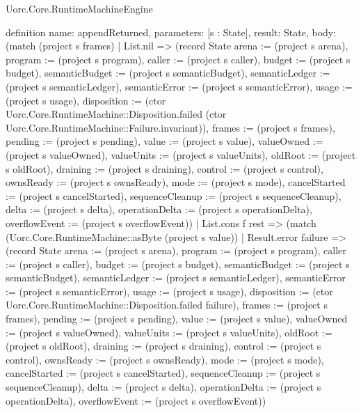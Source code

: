 \begin{lexlean}{Uorc.Core.RuntimeMachineEngine}
\begin{semanticmodule}
definition{
  name: appendReturned,
  parameters: [s : State],
  result: State,
  body: (match (project s frames)
    | List.nil => (record State {arena := (project s arena), program := (project s program), caller := (project s caller), budget := (project s budget), semanticBudget := (project s semanticBudget), semanticLedger := (project s semanticLedger), semanticError := (project s semanticError), usage := (project s usage), disposition := (ctor Uorc.Core.RuntimeMachine::Disposition.failed (ctor Uorc.Core.RuntimeMachine::Failure.invariant)), frames := (project s frames), pending := (project s pending), value := (project s value), valueOwned := (project s valueOwned), valueUnits := (project s valueUnits), oldRoot := (project s oldRoot), draining := (project s draining), control := (project s control), ownsReady := (project s ownsReady), mode := (project s mode), cancelStarted := (project s cancelStarted), sequenceCleanup := (project s sequenceCleanup), delta := (project s delta), operationDelta := (project s operationDelta), overflowEvent := (project s overflowEvent)})
    | List.cons f rest => (match (Uorc.Core.RuntimeMachine::asByte (project s value))
      | Result.error failure => (record State {arena := (project s arena), program := (project s program), caller := (project s caller), budget := (project s budget), semanticBudget := (project s semanticBudget), semanticLedger := (project s semanticLedger), semanticError := (project s semanticError), usage := (project s usage), disposition := (ctor Uorc.Core.RuntimeMachine::Disposition.failed failure), frames := (project s frames), pending := (project s pending), value := (project s value), valueOwned := (project s valueOwned), valueUnits := (project s valueUnits), oldRoot := (project s oldRoot), draining := (project s draining), control := (project s control), ownsReady := (project s ownsReady), mode := (project s mode), cancelStarted := (project s cancelStarted), sequenceCleanup := (project s sequenceCleanup), delta := (project s delta), operationDelta := (project s operationDelta), overflowEvent := (project s overflowEvent)})
}
\end{semanticmodule}
\end{lexlean}
